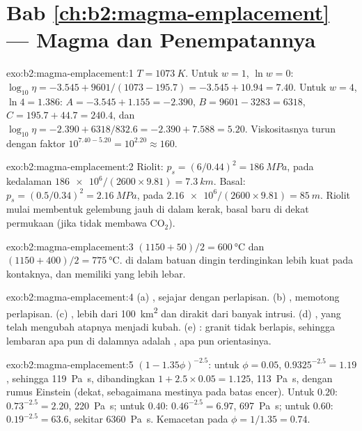 \section*{Bab \ref{ch:b2:magma-emplacement} --- Magma dan Penempatannya}

\begin{solution}{exo:b2:magma-emplacement:1}
$T = \qty{1073}{K}$. Untuk $w = 1$, $\ln w = 0$: $\log_{10}\eta = -3.545 +
9601/(1073 - 195.7) = -3.545 + 10.94 = 7.40$. Untuk $w = 4$, $\ln 4 = 1.386$:
$A = -3.545 + 1.155 = -2.390$, $B = 9601 - 3283 = 6318$, $C = 195.7 + 44.7 =
240.4$, dan $\log_{10}\eta = -2.390 + 6318/832.6 = -2.390 + 7.588 = 5.20$.
Viskositasnya turun dengan faktor $10^{7.40 - 5.20} = 10^{2.20} \approx 160$.
\end{solution}

\begin{solution}{exo:b2:magma-emplacement:2}
Riolit: $p_s = (6/0.44)^2 = \qty{186}{MPa}$, pada kedalaman $\num{186e6}/(2600\times9.81)
= \qty{7.3}{km}$. Basal: $p_s = (0.5/0.34)^2 = \qty{2.16}{MPa}$, pada
$\num{2.16e6}/(2600\times9.81) = \qty{85}{m}$. Riolit mulai membentuk gelembung
jauh di dalam kerak, basal baru di dekat permukaan (jika tidak membawa CO$_2$).
\end{solution}

\begin{solution}{exo:b2:magma-emplacement:3}
$(1150 + 50)/2 = \qty{600}{\celsius}$ dan $(1150 + 400)/2 = \qty{775}{\celsius}$.
 di dalam batuan dingin terdinginkan lebih kuat pada kontaknya, dan memiliki
 yang lebih lebar.
\end{solution}

\begin{solution}{exo:b2:magma-emplacement:4}
(a) , sejajar dengan perlapisan. (b) , memotong perlapisan.
(c) , lebih dari \qty{100}{km^2} dan dirakit dari banyak intrusi.
(d) , yang telah mengubah atapnya menjadi kubah. (e) : granit tidak berlapis,
sehingga lembaran apa pun di dalamnya adalah , apa pun orientasinya.
\end{solution}

\begin{solution}{exo:b2:magma-emplacement:5}
$(1 - 1.35\phi)^{-2.5}$: untuk $\phi = 0.05$, $0.9325^{-2.5} = 1.19$, sehingga
\qty{119}{Pa.s}, dibandingkan $1 + 2.5\times0.05 = 1.125$, \qty{113}{Pa.s}, dengan rumus
Einstein (dekat, sebagaimana mestinya pada batas encer). Untuk $0.20$: $0.73^{-2.5} =
2.20$, \qty{220}{Pa.s}; untuk $0.40$: $0.46^{-2.5} = 6.97$, \qty{697}{Pa.s}; untuk $0.60$:
$0.19^{-2.5} = 63.6$, sekitar \qty{6360}{Pa.s}. Kemacetan pada $\phi = 1/1.35 = 0.74$.
\end{solution}

